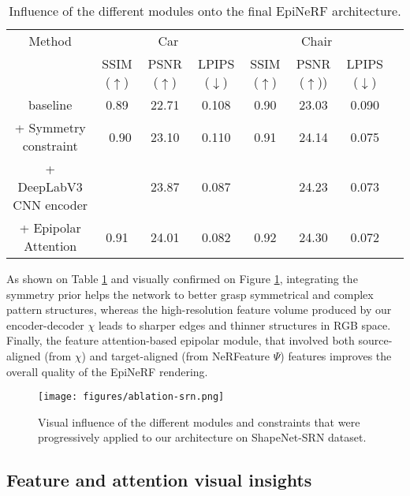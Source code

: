 \begin{table}[htp!]
\caption{Influence of the different modules onto the final EpiNeRF architecture.}
\label{tab:ablation}
\centering
\begin{adjustbox}{width=\textwidth}
\begin{tabular}[h]{c||ccccccc}
\hline
Method & \multicolumn{3}{c}{Car} & \multicolumn{3}{c}{Chair} \\
 &  SSIM ($\uparrow$) & PSNR ($\uparrow$) & LPIPS ($\downarrow$) & SSIM ($\uparrow$) & PSNR ($\uparrow$)) & LPIPS ($\downarrow$)\\[.5pt]
\hline
baseline & 0.89 & 22.71 & 0.108 & 0.90 & 23.03 & 0.090 \\[1.5pt]
\hline 
+ Symmetry constraint \cite{symmnerf}  & \ 0.90 & 23.10  & 0.110 & 0.91 & 24.14 & 0.075 \\
+ DeepLabV3 CNN encoder  & \cellcolor{red!25}{0.91} & 23.87 & 0.087 & \cellcolor{red!25}{0.92} & 24.23 & 0.073 \\
+ Epipolar Attention  & \cellcolor{red!25}0.91 & \cellcolor{red!25}24.01 &\cellcolor{red!25}0.082 & \cellcolor{red!25}0.92 &  \cellcolor{red!25}24.30 &\cellcolor{red!25}0.072 \\
\end{tabular}
\end{adjustbox}

\end{table}

As shown on Table \ref{tab:ablation} and visually confirmed on Figure \ref{fig:ablation}, integrating the symmetry prior helps the network to better grasp symmetrical and complex pattern structures, whereas the high-resolution feature volume produced by our encoder-decoder $\chi$ leads to sharper edges and thinner structures in RGB space. Finally, the feature attention-based epipolar module, that involved both source-aligned (from $\chi$) and target-aligned (from NeRFeature $\Psi$) features improves the overall quality of the EpiNeRF rendering. 

\begin{figure}[htp!]
    \center
  \texttt{[image: figures/ablation-srn.png]}
  \caption{Visual influence of the different modules and constraints that were progressively applied to our architecture on ShapeNet-SRN dataset.}
  \label{fig:ablation}
\end{figure}


\subsection{Feature and attention visual insights}
\label{subsec:visual_insights}


